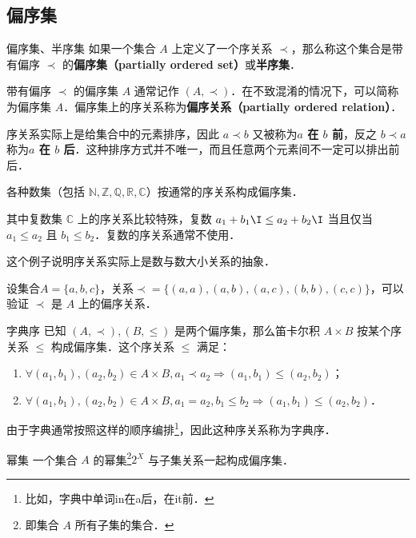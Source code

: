 
\begin{issues}
\issueAbstract
\end{issues}


\subsection{偏序集}

\begin{definition}{偏序集、半序集}
如果一个集合 $A$ 上定义了一个序关系 $\prec$，那么称这个集合是带有偏序 $\prec$ 的\textbf{偏序集（partially ordered set）}或\textbf{半序集}．
\end{definition}

带有偏序 $\prec$ 的偏序集 $A$ 通常记作 $(A,\prec)$．在不致混淆的情况下，可以简称为偏序集 $A$．偏序集上的序关系称为\textbf{偏序关系（partially ordered relation）}．

序关系实际上是给集合中的元素排序，因此 $a \prec b$ 又被称为\textbf{$a$ 在 $b$ 前}，反之 $b \prec a$ 称为\textbf{$a$ 在 $b$ 后}．这种排序方式并不唯一，而且任意两个元素间不一定可以排出前后．

\begin{example}{}
各种数集（包括 $\mathbb{N},\mathbb{Z},\mathbb{Q},\mathbb{R},\mathbb{C}$）按通常的序关系构成偏序集．

其中复数集 $\mathbb{C}$ 上的序关系比较特殊，复数 $a_1+b_1\I \leq a_2+b_2\I$ 当且仅当 $a_1\leq a_2$ 且 $b_1 \leq b_2$．复数的序关系通常不使用．
\end{example}

这个例子说明序关系实际上是数与数大小关系的抽象．

\begin{example}{}
设集合$A = \{a,b,c\}$，关系$\prec\!= \{(a,a),(a,b),(a,c),(b,b),(c,c)\}$，可以验证 $\prec$ 是 $A$ 上的偏序关系．
\end{example}

\begin{example}{字典序}\label{OrdRel_ex1}
已知 $(A,\prec),(B,\leq)$ 是两个偏序集，那么笛卡尔积 $A\times B$ 按某个序关系 $\leqslant$ 构成偏序集．这个序关系 $\leqslant$ 满足：
\begin{enumerate}
\item $\forall(a_1,b_1),(a_2,b_2) \in A\times B, a_1\prec a_2 \Rightarrow (a_1,b_1)\leqslant(a_2,b_2)$；
\item $\forall(a_1,b_1),(a_2,b_2) \in A\times B, a_1=a_2, b_1\leq b_2 \Rightarrow (a_1,b_1) \leqslant (a_2, b_2)$．
\end{enumerate}

由于字典通常按照这样的顺序编排\footnote{比如，字典中单词in在a后，在it前．}，因此这种序关系称为字典序．
\end{example}
\begin{example}{幂集}
一个集合 $A$ 的幂集\footnote{即集合 $A$ 所有子集的集合．}$2^X$ 与子集关系一起构成偏序集．
\end{example}

